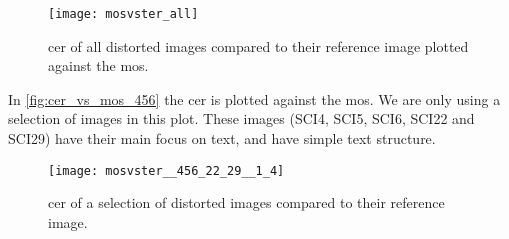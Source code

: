 \begin{figure}[h]
    \centering
    \texttt{[image: mosvster\_all]}
    \caption{\gls{cer} of all distorted images compared to their reference image plotted against the \gls{mos}.}
    \label{fig:cer_vs_mos}
\end{figure}

In \autoref{fig:cer_vs_mos_456} the \gls{cer} is plotted against the \gls{mos}.
We are only using a selection of images in this plot.
These images (SCI4, SCI5, SCI6, SCI22 and SCI29) have their main focus on text, and have simple text structure.
\begin{figure}[h]
    \centering
    \texttt{[image: mosvster\_\_456\_22\_29\_\_1\_4]}
    \caption{\gls{cer} of a selection of distorted images compared to their reference image.}
    \label{fig:cer_vs_mos_456}
\end{figure}
